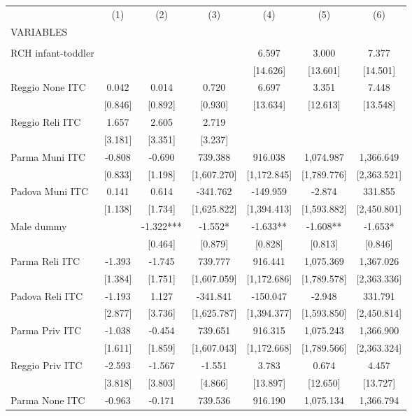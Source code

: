 \begin{tabular}{lcccccc} \hline
 & (1) & (2) & (3) & (4) & (5) & (6) \\
VARIABLES &  &  &  &  &  &  \\ \hline
 &  &  &  &  &  &  \\
RCH infant-toddler &  &  &  & 6.597 & 3.000 & 7.377 \\
 &  &  &  & [14.626] & [13.601] & [14.501] \\
Reggio None ITC & 0.042 & 0.014 & 0.720 & 6.697 & 3.351 & 7.448 \\
 & [0.846] & [0.892] & [0.930] & [13.634] & [12.613] & [13.548] \\
Reggio Reli ITC & 1.657 & 2.605 & 2.719 &  &  &  \\
 & [3.181] & [3.351] & [3.237] &  &  &  \\
Parma Muni ITC & -0.808 & -0.690 & 739.388 & 916.038 & 1,074.987 & 1,366.649 \\
 & [0.833] & [1.198] & [1,607.270] & [1,172.845] & [1,789.776] & [2,363.521] \\
Padova Muni ITC & 0.141 & 0.614 & -341.762 & -149.959 & -2.874 & 331.855 \\
 & [1.138] & [1.734] & [1,625.822] & [1,394.413] & [1,593.882] & [2,450.801] \\
Male dummy &  & -1.322*** & -1.552* & -1.633** & -1.608** & -1.653* \\
 &  & [0.464] & [0.879] & [0.828] & [0.813] & [0.846] \\
Parma Reli ITC & -1.393 & -1.745 & 739.777 & 916.441 & 1,075.369 & 1,367.026 \\
 & [1.384] & [1.751] & [1,607.059] & [1,172.686] & [1,789.578] & [2,363.336] \\
Padova Reli ITC & -1.193 & 1.127 & -341.841 & -150.047 & -2.948 & 331.791 \\
 & [2.877] & [3.736] & [1,625.787] & [1,394.377] & [1,593.850] & [2,450.814] \\
Parma Priv ITC & -1.038 & -0.454 & 739.651 & 916.315 & 1,075.243 & 1,366.900 \\
 & [1.611] & [1.859] & [1,607.043] & [1,172.668] & [1,789.566] & [2,363.324] \\
Reggio Priv ITC & -2.593 & -1.567 & -1.551 & 3.783 & 0.674 & 4.457 \\
 & [3.818] & [3.803] & [4.866] & [13.897] & [12.650] & [13.727] \\
Parma None ITC & -0.963 & -0.171 & 739.536 & 916.190 & 1,075.134 & 1,366.794 \\

\end{tabular}
